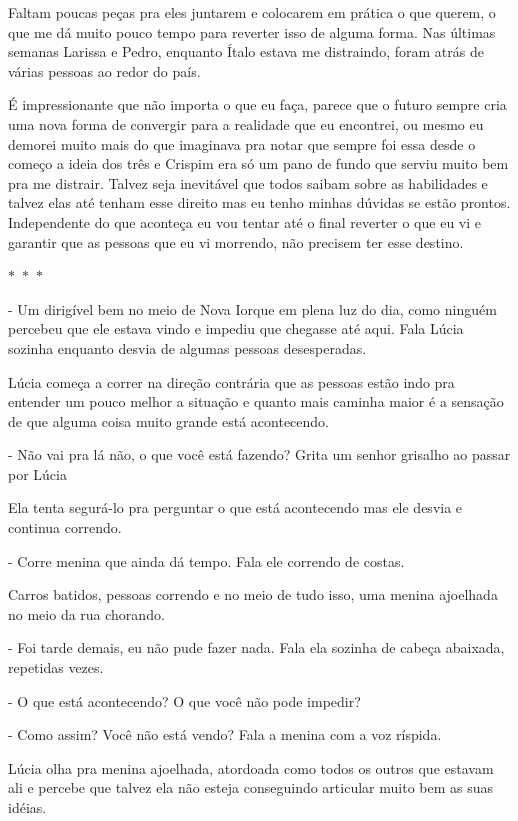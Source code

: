 Faltam poucas peças pra eles juntarem e colocarem em prática o que querem, o que me dá muito pouco tempo para reverter isso de alguma forma. Nas últimas semanas Larissa e Pedro, enquanto Ítalo estava me distraindo, foram atrás de várias pessoas ao redor do país.

É impressionante que não importa o que eu faça, parece que o futuro sempre cria uma nova forma de convergir para a realidade que eu encontrei, ou mesmo eu demorei muito mais do que imaginava pra notar que sempre foi essa desde o começo a ideia dos três e Crispim era só um pano de fundo que serviu muito bem pra me distrair. Talvez seja inevitável que todos saibam sobre as habilidades e talvez elas até tenham esse direito mas eu tenho minhas dúvidas se estão prontos. Independente do que aconteça eu vou tentar até o final reverter o que eu vi e garantir que as pessoas que eu vi morrendo, não precisem ter esse destino.

\begin{center}
	$\ast$~$\ast$~$\ast$
\end{center}

- Um dirigível bem no meio de Nova Iorque em plena luz do dia, como ninguém percebeu que ele estava vindo e impediu que chegasse até aqui. Fala Lúcia sozinha enquanto desvia de algumas pessoas desesperadas.

Lúcia começa a correr na direção contrária que as pessoas estão indo pra entender um pouco melhor a situação e quanto mais caminha maior é a sensação de que alguma coisa muito grande está acontecendo.

- Não vai pra lá não, o que você está fazendo? Grita um senhor grisalho ao passar por Lúcia

Ela tenta segurá-lo pra perguntar o que está acontecendo mas ele desvia e continua correndo.

- Corre menina que ainda dá tempo. Fala ele correndo de costas.

Carros batidos, pessoas correndo e no meio de tudo isso, uma menina ajoelhada no meio da rua chorando.

- Foi tarde demais, eu não pude fazer nada. Fala ela sozinha de cabeça abaixada, repetidas vezes.

- O que está acontecendo? O que você não pode impedir?

- Como assim? Você não está vendo? Fala a menina com a voz ríspida.

Lúcia olha pra menina ajoelhada, atordoada como todos os outros que estavam ali e percebe que talvez ela não esteja conseguindo articular muito bem as suas idéias.


